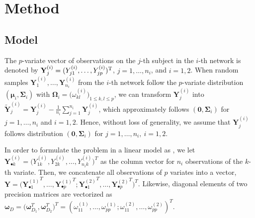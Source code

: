 \documentclass[useAMS,usenatbib,referee]{bio}
\newcommand{\bs}{\boldsymbol}
\begin{document}
{{\section{Method}


\subsection{Model}
The $p$-variate vector of observations on the $j$-th subject in the $i$-th network is denoted by $\mathbf{Y}^{(i)}_j = (Y_{j1}^{(i)}, \ldots, Y_{jp}^{(i)})^{\rm
T}$, $j=1, \ldots, n_i$, and $i=1,2$.
When random samples $\mathbf{Y}^{(i)}_1, \dots, \mathbf{Y}^{(i)}_{n_i}$ from
the $i$-th network follow the $p$-variate distribution 
$(\bs{\mu}_i,\bs{\Sigma}_i)$ with $\bs{\Omega}_i=
\big( \omega^{(i)}_{kl} \big)_{1 \le k,l \le p}$,
we can transform $\mathbf{Y}^{(i)}_{j}$ into $\tilde{\mathbf{Y}}^{(i)}_j = \mathbf{Y}^{(i)}_j - \frac{1}{n_i} \sum_{j=1}^{n_i} \mathbf{Y}^{(i)}_j$,
which approximately follows $(\mathbf{0},\bs{\Sigma}_i)$ for $j=1,\ldots,n_i$ and $i=1,2$.
Hence, without loss of generality, we assume that $\mathbf{Y}^{(i)}_j$ follows distribution $(\mathbf{0},\bs{\Sigma}_i)$ for $j=1,\ldots,n_i,~i=1,2$.

In order to formulate the problem in a linear model as \citet{Peng:2009}, we let
$\mathbf{Y}^{(i)}_{\bullet k} = \big(Y_{1k}^{(i)}, Y_{2k}^{(i)},\ldots,Y_{n_ik}^{(i)} \big)^T$ as the column vector for $n_i$ observations of the $k$-th variate.
Then, we concatenate all observations of $p$ variates into a vector,  
$\mathbf{Y} = \big(
 {\mathbf{Y}^{(1)}_{\bullet 1}}^T, \ldots,{\mathbf{Y}^{(1)}_{\bullet p}}^T;
 {\mathbf{Y}^{(2)}_{\bullet 1}}^T, \ldots, {\mathbf{Y}^{(2)}_{\bullet p}}^T \big)^T$. 
Likewise, diagonal elements of two precision matrices are vectorized as
$\bs{\omega}_D=\big(\bs{\omega}_{D_1}^T, \bs{\omega}_{D_2}^T\big)^T =
(\omega^{(1)}_{11},\ldots,\omega^{(1)}_{pp};\omega^{(2)}_{11},\ldots,\omega^{(2)}_{pp})^T.$

}}
\end{document}
